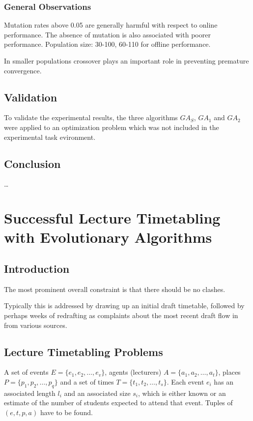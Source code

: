 \documentclass[12pt]{article}
\begin{document}
\subsubsection{General Observations}
Mutation rates above 0.05 are generally harmful with respect to online performance. The absence of mutation is also associated with poorer performance. Population size: 30-100, 60-110 for offline performance.

In smaller populations crossover plays an important role in preventing premature convergence.

\subsection{Validation}
To validate the experimental results, the three algorithms $GA_S$, $GA_1$ and $GA_2$ were applied to an optimization problem which was not included in the experimental task evironment.

\subsection{Conclusion}
\dots
\clearpage

\section{Successful Lecture Timetabling with Evolutionary Algorithms}
\subsection{Introduction}
The most prominent overall constraint is that there should be no clashes.

Typically this is addressed by drawing up an initial draft timetable, followed by perhaps weeks of redrafting as complaints about the most recent draft flow in from various sources.

\subsection{Lecture Timetabling Problems}
A set of events $E = \{e_1, e_2, \dots, e_v\}$, agents (lecturers) $A = \{a_1, a_2, \dots, a_t\}$, places $P = \{p_1, p_2, \dots, p_q\}$ and a set of times $T = \{t_1, t_2, \dots, t_s\}$. Each event $e_i$ has an associated length $l_i$ and an associated size $s_i$, which is either known or an estimate of the number of students expected to attend that event. Tuples of $(e, t, p, a)$ have to be found.
\end{document}
